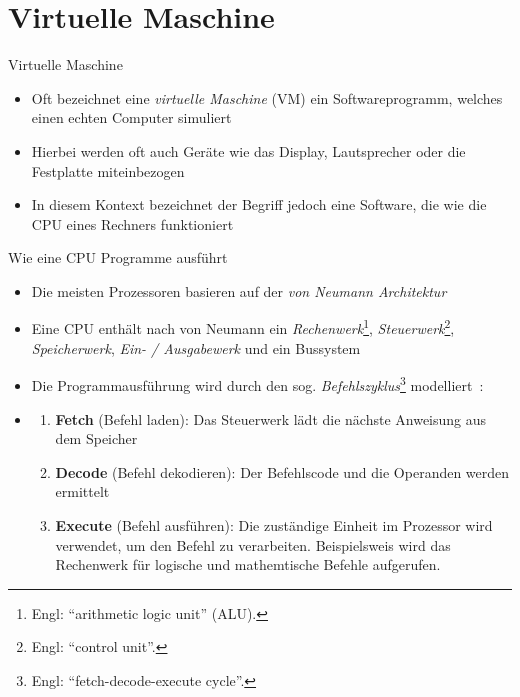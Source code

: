 \section{Virtuelle Maschine}

\begin{frame}{Virtuelle Maschine}
	\begin{itemize}
		\item Oft bezeichnet eine \emph{virtuelle Maschine} (VM) ein Softwareprogramm, welches einen echten Computer simuliert
		\item Hierbei werden oft auch Geräte wie das Display, Lautsprecher oder die Festplatte miteinbezogen
		\item In diesem Kontext bezeichnet der Begriff jedoch eine Software, die wie die CPU eines Rechners funktioniert
	\end{itemize}
\end{frame}

\begin{frame}{Wie eine CPU Programme ausführt}
	\begin{itemize}
		\item Die meisten Prozessoren basieren auf der \emph{von Neumann Architektur}~
		\item Eine CPU enthält nach von Neumann ein \emph{Rechenwerk}\footnote{Engl: \enquote{arithmetic logic unit} (ALU).}, \emph{Steuerwerk}\footnote{Engl: \enquote{control unit}.}, \emph{Speicherwerk}, \emph{Ein- / Ausgabewerk} und ein Bussystem~
		\item Die Programmausführung wird durch den sog. \emph{Befehlszyklus}\footnote{Engl: \enquote{fetch-decode-execute cycle}.} modelliert~:
		\item[] \begin{enumerate}
				\item \textbf{Fetch} (Befehl laden): Das Steuerwerk lädt die nächste Anweisung aus dem Speicher
				\item \textbf{Decode} (Befehl dekodieren): Der Befehlscode und die Operanden werden ermittelt
				\item \textbf{Execute} (Befehl ausführen): Die zuständige Einheit im Prozessor wird verwendet, um den Befehl zu verarbeiten.
				      Beispielsweis wird das Rechenwerk für logische und mathemtische Befehle aufgerufen.
			\end{enumerate}
	\end{itemize}
\end{frame}

